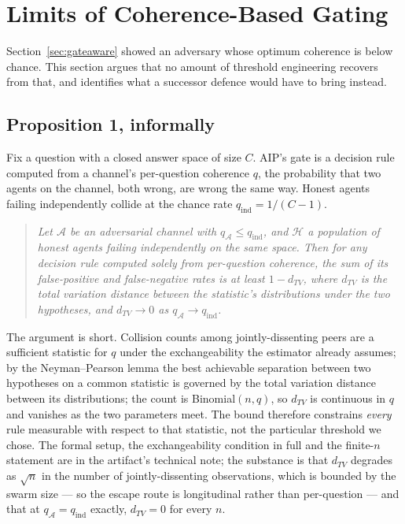 \section{Limits of Coherence-Based Gating}
\label{sec:limits}

Section~\ref{sec:gateaware} showed an adversary whose optimum coherence is below
chance. This section argues that no amount of threshold engineering recovers
from that, and identifies what a successor defence would have to bring instead.

\subsection{Proposition 1, informally}

Fix a question with a closed answer space of size $C$. AIP's gate is a decision
rule computed from a channel's per-question coherence $q$, the probability that
two agents on the channel, both wrong, are wrong the same way. Honest agents
failing independently collide at the chance rate $q_{\mathrm{ind}} = 1/(C-1)$.

\begin{quote}
\emph{Let $\mathcal{A}$ be an adversarial channel with $q_{\mathcal{A}} \leq
q_{\mathrm{ind}}$, and $\mathcal{H}$ a population of honest agents failing
independently on the same space. Then for any decision rule computed solely from
per-question coherence, the sum of its false-positive and false-negative rates is
at least $1 - d_{TV}$, where $d_{TV}$ is the total variation distance between the
statistic's distributions under the two hypotheses, and $d_{TV} \to 0$ as
$q_{\mathcal{A}} \to q_{\mathrm{ind}}$.}
\end{quote}

The argument is short. Collision counts among jointly-dissenting peers are a
sufficient statistic for $q$ under the exchangeability the estimator already
assumes; by the Neyman--Pearson lemma the best achievable separation between two
hypotheses on a common statistic is governed by the total variation distance
between its distributions; the count is Binomial$(n, q)$, so $d_{TV}$ is
continuous in $q$ and vanishes as the two parameters meet. The bound therefore
constrains \emph{every} rule measurable with respect to that statistic, not the
particular threshold we chose. The formal setup, the exchangeability condition in
full and the finite-$n$ statement are in the artifact's technical note; the
substance is that $d_{TV}$ degrades as $\sqrt{n}$ in the number of
jointly-dissenting observations, which is bounded by the swarm size --- so the
escape route is longitudinal rather than per-question --- and that at
$q_{\mathcal{A}} = q_{\mathrm{ind}}$ exactly, $d_{TV}=0$ for every $n$.

